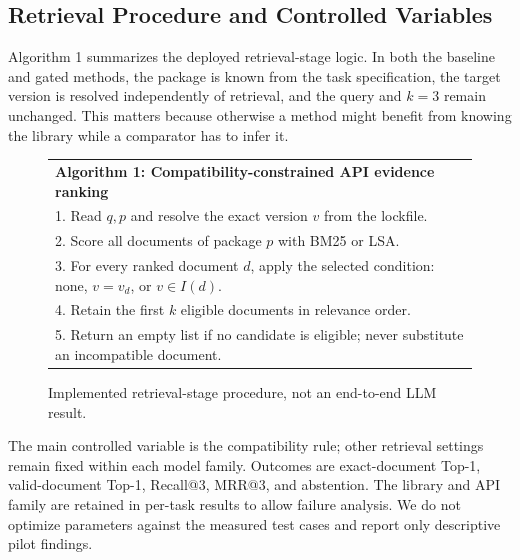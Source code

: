 \documentclass[conference]{IEEEtran}
\begin{document}
\subsection{Retrieval Procedure and Controlled Variables}
Algorithm 1 summarizes the deployed retrieval-stage logic. In both the baseline and gated methods, the package is known from the task specification, the target version is resolved independently of retrieval, and the query and $k=3$ remain unchanged. This matters because otherwise a method might benefit from knowing the library while a comparator has to infer it.
\begin{figure}[t]
\small
\begin{tabular}{p{}}
\toprule
\textbf{Algorithm 1: Compatibility-constrained API evidence ranking}\\
1. Read $q,p$ and resolve the exact version $v$ from the lockfile.\\
2. Score all documents of package $p$ with BM25 or LSA.\\
3. For every ranked document $d$, apply the selected condition: none, $v=v_d$, or $v\in I(d)$.\\
4. Retain the first $k$ eligible documents in relevance order.\\
5. Return an empty list if no candidate is eligible; never substitute an incompatible document.\\
\bottomrule
\end{tabular}
\caption{Implemented retrieval-stage procedure, not an end-to-end LLM result.}
\label{fig:algo}
\end{figure}

The main controlled variable is the compatibility rule; other retrieval settings remain fixed within each model family. Outcomes are exact-document Top-1, valid-document Top-1, Recall@3, MRR@3, and abstention. The library and API family are retained in per-task results to allow failure analysis. We do not optimize parameters against the measured test cases and report only descriptive pilot findings.
\end{document}
